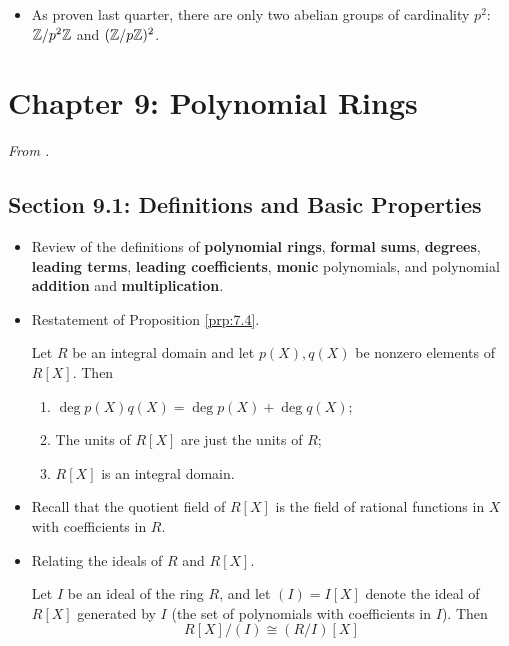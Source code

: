\documentclass[../notes.tex]{subfiles}
\begin{document}
\begin{itemize}
\begin{itemize}
        \item As proven last quarter, there are only two abelian groups of cardinality $p^2$: $\mathbb{Z}/p^2\mathbb{Z}$ and $(\mathbb{Z}/p\mathbb{Z})^2$.
    \end{itemize}
\end{itemize}



\section{Chapter 9: Polynomial Rings}
\emph{From \textcite{bib:DummitFoote}.}
\setcounter{bookch}{9}
\subsection*{Section 9.1: Definitions and Basic Properties}
\begin{itemize}
    \item {}Review of the definitions of \textbf{polynomial rings}, \textbf{formal sums}, \textbf{degrees}, \textbf{leading terms}, \textbf{leading coefficients}, \textbf{monic} polynomials, and polynomial \textbf{addition} and \textbf{multiplication}.
    \item Restatement of Proposition \ref{prp:7.4}.
    \begin{proposition}\label{prp:9.1}
        Let $R$ be an integral domain and let $p(X),q(X)$ be nonzero elements of $R[X]$. Then
        \begin{enumerate}
            \item $\deg p(X)q(X)=\deg p(X)+\deg q(X)$;
            \item The units of $R[X]$ are just the units of $R$;
            \item $R[X]$ is an integral domain.
        \end{enumerate}
    \end{proposition}
    \item Recall that the quotient field of $R[X]$ is the field of rational functions in $X$ with coefficients in $R$.
    \item Relating the ideals of $R$ and $R[X]$.
    \begin{proposition}\label{prp:9.2}
        Let $I$ be an ideal of the ring $R$, and let $(I)=I[X]$ denote the ideal of $R[X]$ generated by $I$ (the set of polynomials with coefficients in $I$). Then
        \begin{equation*}
            R[X]/(I) \cong (R/I)[X]
        \end{equation*}

\end{proposition}
\end{itemize}
\end{document}
